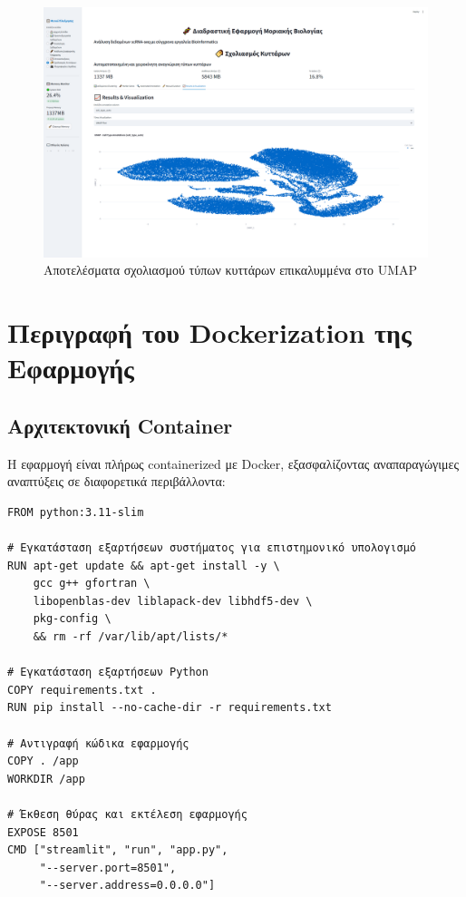 \documentclass[11pt,a4paper]{article}
\begin{document}
\begin{figure}[H]
    \centering
    \includegraphics[width=1.0\linewidth]{annotation.png}
    \caption{Αποτελέσματα σχολιασμού τύπων κυττάρων επικαλυμμένα στο UMAP}
    \label{fig:cell_annotation}
\end{figure}

\section{Περιγραφή του Dockerization της Εφαρμογής}

\subsection{Αρχιτεκτονική Container}

Η εφαρμογή είναι πλήρως containerized με Docker, εξασφαλίζοντας αναπαραγώγιμες αναπτύξεις σε διαφορετικά περιβάλλοντα:

\begin{lstlisting}[language=Docker, caption={Υλοποίηση Dockerfile}]
FROM python:3.11-slim

# Εγκατάσταση εξαρτήσεων συστήματος για επιστημονικό υπολογισμό
RUN apt-get update && apt-get install -y \
    gcc g++ gfortran \
    libopenblas-dev liblapack-dev libhdf5-dev \
    pkg-config \
    && rm -rf /var/lib/apt/lists/*

# Εγκατάσταση εξαρτήσεων Python
COPY requirements.txt .
RUN pip install --no-cache-dir -r requirements.txt

# Αντιγραφή κώδικα εφαρμογής
COPY . /app
WORKDIR /app

# Έκθεση θύρας και εκτέλεση εφαρμογής
EXPOSE 8501
CMD ["streamlit", "run", "app.py", 
     "--server.port=8501", 
     "--server.address=0.0.0.0"]
\end{lstlisting}
\end{document}
